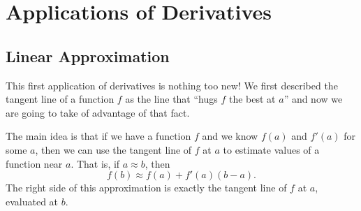 
\section{Applications of Derivatives}


\subsection{Linear Approximation}

This first application of derivatives is nothing too new! We first described the tangent line of a function $f$ as the line that ``hugs $f$ the best at $a$'' and now we are going to take of advantage of that fact.

The main idea is that if we have a function $f$ and we know $f(a)$ and $f'(a)$ for some $a$, then we can use the tangent line of $f$ at $a$ to estimate values of a function near $a$. That is, if $a\approx b$, then
$$f(b)\approx f(a)+f'(a)(b-a).$$
The right side of this approximation is exactly the tangent line of $f$ at $a$, evaluated at $b$.

